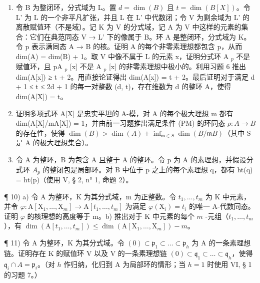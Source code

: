 \begin{enumerate}
\def\labelenumi{\arabic{enumi})}
\setcounter{enumi}{6}
\item
  令 B 为整闭环，分式域为 L。置 \(d = \dim(B)\) 且 \(t = \dim(B[X])\)。令 L' 为 L 的一个非平凡扩张，并且 L 在 L' 中代数闭；令 V 为剩余域为 L' 的离散赋值环（不是域）。记 K 为 V 的分式域，记 A 为 V 中这样的元素的集合：它们在典范同态 V → L' 下的像属于 B。环 A 是整闭环，分式域为 K。令 p 表示满同态 A → B 的核。证明 A 的每个非零素理想都包含 p，从而 dim(A) = dim(B) + 1。取 V 中像不属于 L 的元素 x，证明分式环 A \(_{p}\) 不是赋值环，且 pA \(_{p}\) {[}x{]} 不是 A \(_{p}\) {[}x{]} 的非零素理想中极小的。利用习题 6 推出 dim(A{[}x{]}) ≥ t + 2。用直接论证得出 dim(A{[}x{]}) = t + 2。最后证明对于满足 d + 1 ≤ t ≤ 2d + 1 的每一对整数 (d, t)，存在维数为 d 的整环 A，使得 dim(A{[}X{]}) = t。
\item
  证明多项式环 A{[}X{]} 是忠实平坦的 A-模，对 A 的每个极大理想 m 都有 dim(A{[}X{]}/mA{[}X{]}) = 1，并由前一习题推出满足条件 (PM) 的环同态 \(\rho: A \to B\) 的存在性，使得 \(\dim(B) > \dim(A) + \inf_{\mathfrak{m}\in S}\dim(B/\mathfrak{m}B)\)（其中 S 是 A 的极大理想集合）。
\item
  令 A 为整环，B 为包含 A 且整于 A 的整环。令 p 为 A 的素理想，并假设分式环 \(A_{p}\) 的整闭包是局部环。对 B 中位于 p 之上的每个素理想 q，都有 ht(q) = ht(p)（使用 V, § 2, n° 1, 命题 2）。
\end{enumerate}

¶ 10) a) 令 A 为整环，K 为其分式域，m 为正整数。令 \(t_1, \ldots, t_m\) 为 K 中元素，并令 \(\varphi: \mathrm{A}[\mathrm{X}_1, \ldots, \mathrm{X}_m] \to \mathrm{A}[t_1, \ldots, t_m]\) 为满足 \(\varphi(\mathrm{X}_i) = t_i\) 的唯一 A-代数同态。证明 \(\varphi\) 的核理想的高度等于 m。b) 推出对于 K 中元素的每个 \(m\) -元组（\(t_1, \ldots, t_m\)），有 \(\dim(\mathrm{A}[t_1, \ldots, t_m]) \leqslant \dim(\mathrm{A}[\mathrm{X}_1, \ldots, \mathrm{X}_m]) - m\)。

¶ 11) 令 A 为整环，K 为其分式域。令 \((0) \subset \mathfrak{p}_1 \subset \ldots \subset \mathfrak{p}_h\) 为 A 的一条素理想链。证明存在 K 的赋值环 V 以及 V 的一条素理想链 \((0) \subset \mathfrak{q}_1 \subset \ldots \subset \mathfrak{q}_h\)，使得 \(\mathfrak{q}_i \cap A = \mathfrak{p}_i\)。（对 \(h\) 作归纳，化归到 A 为局部环的情形；当 \(h = 1\) 时使用 VI, § 1 的习题 7。）


